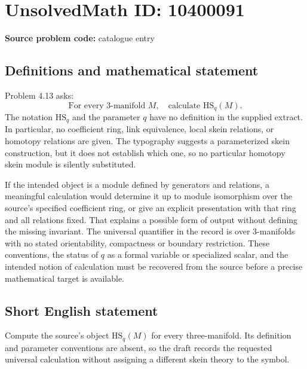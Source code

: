 \documentclass[11pt]{article}
\begin{document}
\section*{UnsolvedMath ID: 10400091}
\textbf{Source problem code:} catalogue entry
\subsection{Definitions and mathematical statement}
Problem 4.13 asks:
\[
 \text{For every }3\text{-manifold }M,\quad
 \text{calculate }\mathrm{HS}_q(M).
\]
The notation \(\mathrm{HS}_q\) and the parameter \(q\) have no definition in the supplied extract. In particular, no coefficient ring, link equivalence, local skein relations, or homotopy relations are given. The typography suggests a parameterized skein construction, but it does not establish which one, so no particular homotopy skein module is silently substituted.

If the intended object is a module defined by generators and relations, a meaningful calculation would determine it up to module isomorphism over the source's specified coefficient ring, or give an explicit presentation with that ring and all relations fixed. That explains a possible form of output without defining the missing invariant. The universal quantifier in the record is over \(3\)-manifolds with no stated orientability, compactness or boundary restriction. These conventions, the status of \(q\) as a formal variable or specialized scalar, and the intended notion of calculation must be recovered from the source before a precise mathematical target is available.
\subsection{Short English statement}
Compute the source's object \(\mathrm{HS}_q(M)\) for every three-manifold. Its definition and parameter conventions are absent, so the draft records the requested universal calculation without assigning a different skein theory to the symbol.
\end{document}
